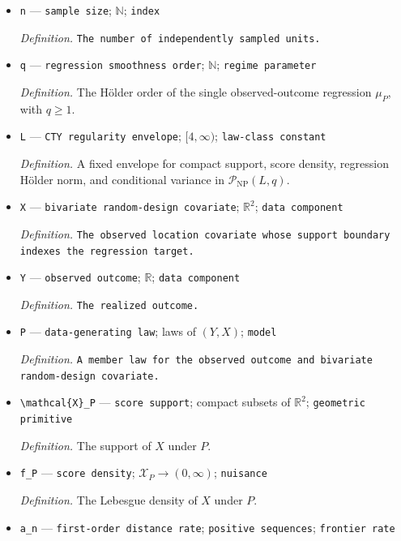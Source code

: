 \documentclass{article}
\begin{document}
\begin{itemize}
  \item \texttt{n} --- \texttt{sample size}; \(\mathbb{N}\); \texttt{index}
  \par\smallskip\noindent\emph{Definition.} \texttt{The number of independently sampled units.}
  \item \texttt{q} --- \texttt{regression smoothness order}; \(\mathbb{N}\); \texttt{regime parameter}
  \par\smallskip\noindent\emph{Definition.} The H\"older order of the single observed-outcome regression \(\mu_P\), with \(q\geq1\).
  \item \texttt{L} --- \texttt{CTY regularity envelope}; \([4,\infty)\); \texttt{law-\allowbreak{}class constant}
  \par\smallskip\noindent\emph{Definition.} A fixed envelope for compact support, score density, regression H\"older norm, and conditional variance in \(\mathcal P_{\mathrm{NP}}(L,q)\).
  \item \texttt{X} --- \texttt{bivariate random-\allowbreak{}design covariate}; \(\mathbb{R}^2\); \texttt{data component}
  \par\smallskip\noindent\emph{Definition.} \texttt{The observed location covariate whose support boundary indexes the regression target.}
  \item \texttt{Y} --- \texttt{observed outcome}; \(\mathbb{R}\); \texttt{data component}
  \par\smallskip\noindent\emph{Definition.} \texttt{The realized outcome.}
  \item \texttt{P} --- \texttt{data-\allowbreak{}generating law}; laws of \((Y,X)\); \texttt{model}
  \par\smallskip\noindent\emph{Definition.} \texttt{A member law for the observed outcome and bivariate random-\allowbreak{}design covariate.}
  \item \texttt{\textbackslash{}\allowbreak{}mathcal\{X\}\allowbreak{}\_\allowbreak{}P} --- \texttt{score support}; compact subsets of \(\mathbb{R}^2\); \texttt{geometric primitive}
  \par\smallskip\noindent\emph{Definition.} The support of \(X\) under \(P\).
  \item \texttt{f\_\allowbreak{}P} --- \texttt{score density}; \(\mathcal{X}_P\to(0,\infty)\); \texttt{nuisance}
  \par\smallskip\noindent\emph{Definition.} The Lebesgue density of \(X\) under \(P\).
  \item \texttt{a\_\allowbreak{}n} --- \texttt{first-\allowbreak{}order distance rate}; \texttt{positive sequences}; \texttt{frontier rate}

\end{itemize}
\end{document}
